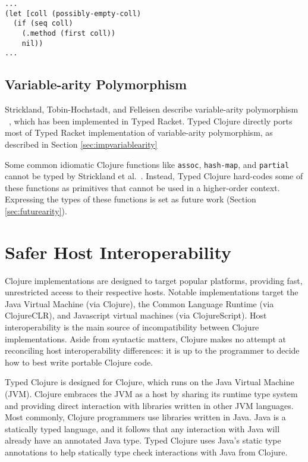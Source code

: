 \begin{lstlisting}[caption=Example of using the sequence abstraction with occurrence typing, label=lst:seqocc]
...
(let [coll (possibly-empty-coll)
  (if (seq coll)
    (.method (first coll))
    nil))
...
\end{lstlisting}

\subsection{Variable-arity Polymorphism}

Strickland, Tobin-Hochstadt, and Felleisen describe variable-arity poly\-morphism ~\cite{STF09},
which has been implemented in Typed Racket.
Typed Clojure directly ports most of Typed Racket implementation of variable-arity polymorphism,
as described in Section \ref{sec:impvariablearity}

Some common idiomatic Clojure functions like \lstinline|assoc|, \lstinline|hash-map|,
and \lstinline|partial| cannot be typed by Strickland et al.\ .
Instead, Typed Clojure hard-codes some of these functions as primitives that cannot
be used in a higher-order context.
Expressing the types of these functions is set as future work (Section \ref{sec:futurearity}).

\section{Safer Host Interoperability}

Clojure implementations are designed to target popular platforms, 
providing fast, unrestricted access to their respective hosts.
Notable implementations target
the Java Virtual Machine (via Clojure), the Common Language Runtime (via ClojureCLR),
and Javascript virtual machines (via ClojureScript). 
Host interoperability is the main source of incompatibility between Clojure implementations.
Aside from syntactic matters, Clojure makes no attempt at reconciling
host interoperability differences:
it is up to the programmer to decide how to best write portable Clojure code.

Typed Clojure is designed for Clojure, which runs on the Java Virtual Machine (JVM).
Clojure embraces the JVM as a host by sharing its runtime type system and providing direct
interaction with libraries written in other JVM languages. Most commonly, Clojure programmers
use libraries written in Java. Java is a statically typed language, and it follows that any interaction with
Java will already have an annotated Java type. Typed Clojure uses Java's static type annotations
to help statically type check interactions with Java from Clojure.

